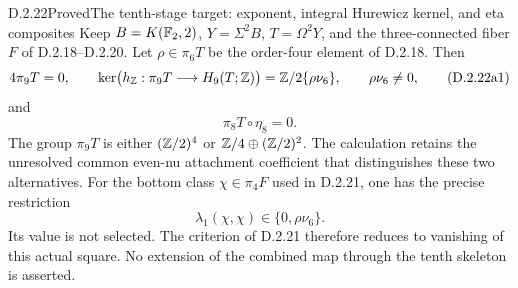 \begin{claim}{D.2.22}{Proved}{The tenth-stage target: exponent, integral Hurewicz kernel, and eta composites}
Keep $B=K(\mathbb F_2,2)$, $Y=\Sigma^2B$, $T=\Omega^2Y$, and the
three-connected fiber $F$ of \textup{D.2.18--D.2.20}.
Let $\rho\in\pi_6T$ be the order-four element of
\textup{D.2.18}. Then
\[
 4\pi_9T=0,\qquad
 \ker\bigl(h_{\mathbb Z}:\pi_9T\longrightarrow H_9(T;\mathbb Z)\bigr)
   =\mathbb Z/2\{\rho\nu_6\},\qquad \rho\nu_6\ne0,
 \tag{D.2.22a1}
\]
and
\[
 \pi_8T\circ\eta_8=0.
 \tag{D.2.22a2}
\]
The group $\pi_9T$ is either $(\mathbb Z/2)^4$ or
$\mathbb Z/4\oplus(\mathbb Z/2)^2$. The calculation retains the unresolved
common even-nu attachment coefficient that distinguishes these
two alternatives. For the bottom class $\chi\in\pi_4F$ used in
\textup{D.2.21}, one has the precise restriction
\[
 \lambda_1(\chi,\chi)\in\{0,\rho\nu_6\}.
 \tag{D.2.22a18}
\]
Its value is not selected. The criterion of \textup{D.2.21}
therefore reduces to vanishing of this actual square. No extension
of the combined map through the tenth skeleton is asserted.
\end{claim}
